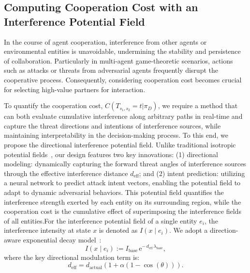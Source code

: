 \documentclass[10pt]{article} %
\begin{document}
\subsection{Computing Cooperation Cost with an Interference Potential Field}

In the course of agent cooperation, interference from other agents or environmental entities is unavoidable, undermining the stability and persistence of collaboration. Particularly in multi-agent game-theoretic scenarios, actions such as attacks or threats from adversarial agents frequently disrupt the cooperative process. Consequently, considering cooperation cost becomes crucial for selecting high-value partners for interaction.

To quantify the cooperation cost, \(C(T_{s_1,s_2}=t|\pi_D)\), we require a method that can both evaluate cumulative interference along arbitrary paths in real-time and capture the threat directions and intentions of interference sources, while maintaining interpretability in the decision-making process. To this end, we propose the directional interference potential field.
Unlike traditional isotropic potential fields~\citep{khatib1986real}, our design features two key innovations: (1) directional modeling: dynamically capturing the forward threat angles of interference sources through the effective interference distance \(d_{\text{eff}}\); and (2) intent prediction: utilizing a neural network to predict attack intent vectors, enabling the potential field to adapt to dynamic adversarial behaviors. This potential field quantifies the interference strength exerted by each entity on its surrounding region, while the cooperation cost is the cumulative effect of superimposing the interference fields of all entities.For the interference potential field of a single entity \(e_i\), the interference intensity at state \(x\) is denoted as \(I(x \mid e_i)\). We adopt a direction-aware exponential decay model~\citep{goldsmith2005wireless}:
\[
I(x \mid e_i) := I_{\text{base}} \, \mathrm{e}^{-\, d_{\text{eff}} \, \lambda_{\text{base}}},
\]
where the key directional modulation term is:
\[
d_{\text{eff}} = d_{\text{actual}} (1 + \alpha (1 - \cos(\theta))).
\]
\end{document}
